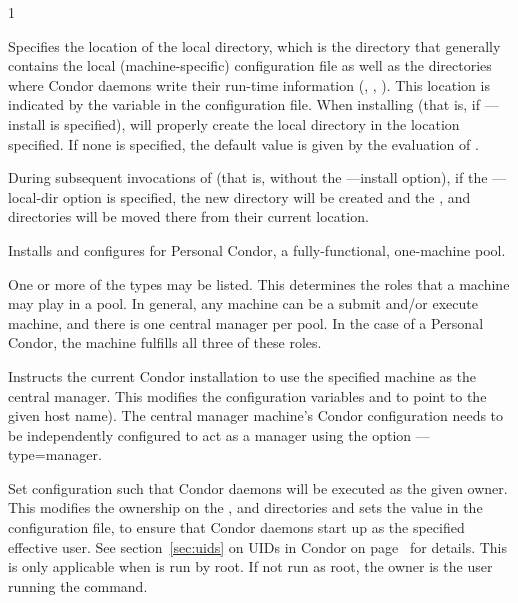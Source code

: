 \begin{ManPage}{\label{man-condor-configure}}{1}
\begin{Options}
	 {Specifies the
	location of the local directory, which is the directory that generally 
	contains the local (machine-specific) configuration file as well as the
	directories where Condor daemons write their run-time information 
	(, , ).
	This location is indicated  by the  
	variable in the configuration file. 
	When installing (that is, if ---install is specified),
	will properly create the local directory in the location specified.
	If none is specified, the default value is given by the evaluation of
        .

	During subsequent invocations of 
	(that is, without the ---install option),
	if the ---local-dir option is specified, the new directory
	will be created and the ,  and  
	directories will be moved there from their current location.}

	 {Installs and configures for 
	 Personal Condor, a fully-functional, one-machine pool.}

	 {One
	or more of the types may be listed.
	This determines the roles that a machine may play in a pool.
	In general, any machine can be a submit and/or execute machine,
	and there is one central manager per pool.
	In the case of a Personal Condor,
	the machine fulfills all three of these roles.}

	 {Instructs
	the current Condor installation to use the specified machine
	as the central manager. 
	This modifies the configuration variables 
	and  to point to the given host name).
	The central manager machine's Condor configuration needs
	to be independently configured to 
	act as a manager using the option ---type=manager. }

	 {Set configuration
	such that Condor daemons will be executed as the given owner.
	This modifies the 
	ownership on the ,  and 
	directories and sets the  value
	in the configuration file,
	to ensure that Condor daemons start up as the specified effective user.
	See section~\ref{sec:uids} on
        UIDs in Condor on page~\pageref{sec:uids} for details.
	This is only applicable when  is run by root.
	If not run as root, the owner is the user running
	the  command.  }


\end{Options}
\end{ManPage}

